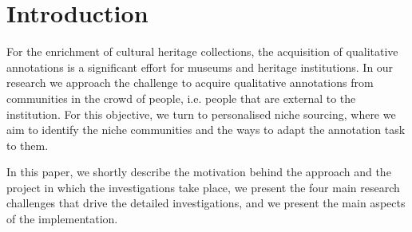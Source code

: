 \section{Introduction}\label{introduction}
For the enrichment of cultural heritage collections, the acquisition of qualitative annotations is a significant effort for museums and heritage institutions. In our research we approach the challenge to acquire qualitative annotations from communities in the crowd of people, i.e. people that are external to the institution. For this objective, we turn to personalised niche sourcing, where we aim to identify the niche communities and the ways to adapt the annotation task to them.

In this paper, we shortly describe the motivation behind the approach and the project in which the investigations take place, we present the four main research challenges that  drive the detailed investigations, and we present the main aspects of the implementation.
